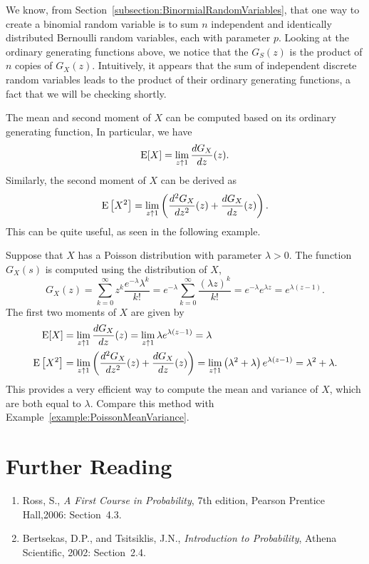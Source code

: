 We know, from Section~\ref{subsection:BinormialRandomVariables}, that one way to create a binomial random variable is to sum $n$ independent and identically distributed Bernoulli random variables, each with parameter $p$.
Looking at the ordinary generating functions above, we notice that the $G_S(z)$ is the product of $n$ copies of $G_X(z)$.
Intuitively, it appears that the sum of independent discrete random variables leads to the product of their ordinary generating functions, a fact that we will be checking shortly.

The mean and second moment of $X$ can be computed based on its ordinary generating function,
In particular, we have
\begin{equation*}
\mathrm{E} [X] = \lim_{z \uparrow 1} \frac{d G_X}{dz}(z) .
\end{equation*}
Similarly, the second moment of $X$ can be derived as
\begin{equation*}
\mathrm{E} \left[ X^2 \right]
= \lim_{z \uparrow 1} \left( \frac{d^2 G_X}{dz^2}(z) + \frac{d G_X}{dz}(z) \right) .
\end{equation*}
This can be quite useful, as seen in the following example.

\begin{example}
Suppose that $X$ has a Poisson distribution with parameter $\lambda > 0$.
The function $G_X(s)$ is computed using the distribution of $X$,
\begin{equation*}
G_X(z) = \sum_{k = 0}^\infty z^{k} \frac{e^{-\lambda}\lambda^k}{k!}
= e^{-\lambda} \sum_{k = 0}^\infty \frac{(\lambda z)^k}{k!}
= e^{-\lambda} e^{\lambda z} = e^{\lambda(z - 1)} .
\end{equation*}
The first two moments of $X$ are given by
\begin{align*}
\mathrm{E} [X] &= \lim_{z \uparrow 1} \frac{d G_X}{dz} (z)
= \lim_{z \uparrow 1} \lambda e^{\lambda(z - 1)} = \lambda \\
\mathrm{E} \left[ X^2 \right] &= \lim_{z \uparrow 1}
\left( \frac{d^2 G_X}{dz^2} (z) + \frac{d G_X}{dz} (z) \right)
= \lim_{z \uparrow 1} \left( \lambda^2 + \lambda \right)
e^{\lambda (z - 1)} = \lambda^2 + \lambda .
\end{align*}
This provides a very efficient way to compute the mean and variance of $X$, which are both equal to $\lambda$.
Compare this method with Example~\ref{example:PoissonMeanVariance}.
\end{example}


\section*{Further Reading}

\begin{small}
\begin{enumerate}
\item Ross, S., \emph{A First Course in Probability}, 7th edition, Pearson Prentice Hall,2006: Section~4.3.
\item Bertsekas, D.P., and Tsitsiklis, J.N., \emph{Introduction to Probability}, Athena Scientific, 2002: Section~2.4.
\end{enumerate}
\end{small}

